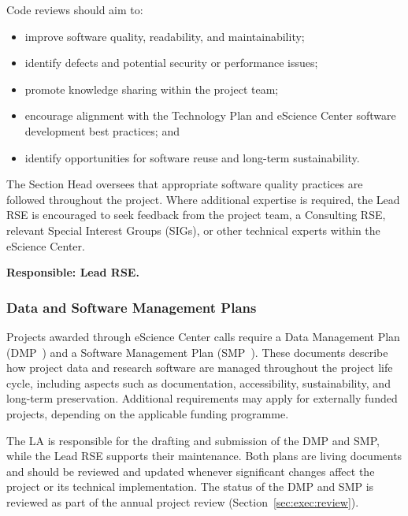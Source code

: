 Code reviews should aim to:
\vspace{-0.2cm}
\begin{itemize}\itemsep0em
\item improve software quality, readability, and maintainability;
\item identify defects and potential security or performance issues;
\item promote knowledge sharing within the project team;
\item encourage alignment with the Technology Plan and eScience Center software development best practices; and
\item identify opportunities for software reuse and long-term sustainability.
\end{itemize}

The Section Head oversees that appropriate software quality practices are followed throughout the project. Where 
additional expertise is required, the Lead RSE is encouraged to seek feedback from the project team, a Consulting RSE, 
relevant Special Interest Groups (SIGs), or other technical experts within the eScience Center.

\textbf{Responsible: Lead RSE.}

\subsubsection{Data and Software Management Plans}
\label{sec:exec:dsmp}
Projects awarded through eScience Center calls require a Data Management Plan (DMP~\cite{dmp-guide}) and a Software
Management Plan (SMP~\cite{smp-guide}). These documents describe how project data and research software are managed
throughout the project life cycle, including aspects such as documentation, accessibility, sustainability, and
long-term preservation. Additional requirements may apply for externally funded projects, depending on the applicable
funding programme.

The LA is responsible for the drafting and submission of the DMP and SMP, while the Lead RSE supports their maintenance. 
Both plans are living documents and should be reviewed and updated whenever significant changes affect the project or 
its technical implementation. The status of the DMP and SMP is reviewed as part of the annual project review 
(Section~\ref{sec:exec:review}).

